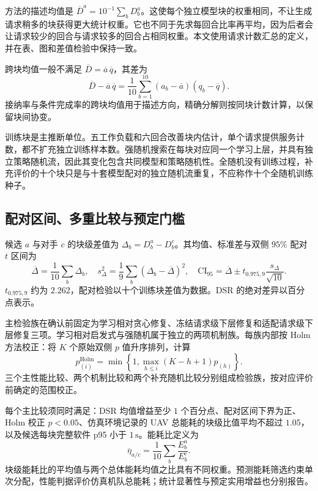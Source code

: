 方法的描述均值是 $\overline D^a=10^{-1}\sum_bD_b^a$。这使每个独立模型块的权重相同，不让生成请求稍多的块获得更大统计权重。它也不同于先求每回合比率再平均，因为后者会让请求较少的回合与请求较多的回合占相同权重。本文使用请求计数汇总的定义，并在表、图和差值检验中保持一致。

跨块均值一般不满足 $\overline D=\overline a\,\overline q$，其差为
\begin{equation}
 \overline D-\overline a\,\overline q
 =\frac1{10}\sum_{b=1}^{10}(a_b-\overline a)(q_b-\overline q).
 \label{legacy:eq:ch5-mean-product}
\end{equation}
接纳率与条件完成率的跨块均值用于描述方向，精确分解则按同块计数计算，以保留块间协变。

训练块是主推断单位。五工作负载和六回合改善块内估计，单个请求提供服务计数，都不扩充独立训练样本数。强随机搜索在每块对应同一个学习上层，并具有独立策略随机流，因此其变化包含共同模型和策略随机性。全随机没有训练过程，补充评价的十个块只是与十套模型配对的独立随机流重复，不应称作十个全随机训练种子。

\subsection{配对区间、多重比较与预定门槛}

候选 $a$ 与对手 $c$ 的块级差值为 $\Delta_b=D_b^a-D_b^c$。其均值、标准差与双侧 $95\%$ 配对 $t$ 区间为
\begin{equation}
 \overline\Delta=\frac1{10}\sum_b\Delta_b,\quad
 s_\Delta^2=\frac1{9}\sum_b(\Delta_b-\overline\Delta)^2,\quad
 \mathrm{CI}_{95}=\overline\Delta\pm t_{0.975,9}\frac{s_\Delta}{\sqrt{10}}.
 \label{legacy:eq:ch5-paired-ci}
\end{equation}
$t_{0.975,9}$ 约为 $2.262$，配对检验以十个训练块差值为数据。DSR 的绝对差异以百分点表示。

主检验族在确认前固定为学习相对贪心修复、冻结请求级下层修复和适配请求级下层修复三项。学习相对启发式与强随机属于独立的两项机制族。每族内部按 Holm 方法校正：将 $K$ 个原始双侧 $p$ 值升序排列，计算
\begin{equation}
 p_{(i)}^{\mathrm{Holm}}=
 \min\left\{1,\max_{h\le i}(K-h+1)p_{(h)}\right\}.
 \label{legacy:eq:ch5-holm}
\end{equation}
三个主性能比较、两个机制比较和两个补充随机比较分别组成检验族，按对应评价前确定的范围校正。

每个主比较须同时满足：DSR 均值增益至少 $1$ 个百分点、配对区间下界为正、Holm 校正 $p<0.05$、仿真环境记录的 UAV 总能耗的块级比值平均不超过 $1.05$，以及候选每块完整软件 p95 小于 $1\,\mathrm{s}$。能耗比定义为
\begin{equation}
 \overline\eta_{a/c}=\frac1{10}\sum_b\frac{E_b^a}{E_b^c}.
 \label{legacy:eq:ch5-energy-ratio}
\end{equation}
块级能耗比的平均值与两个总体能耗均值之比具有不同权重。预测能耗筛选约束单次分配，性能判据评价仿真机队总能耗；统计显著性与预定实用增益也分别报告。

